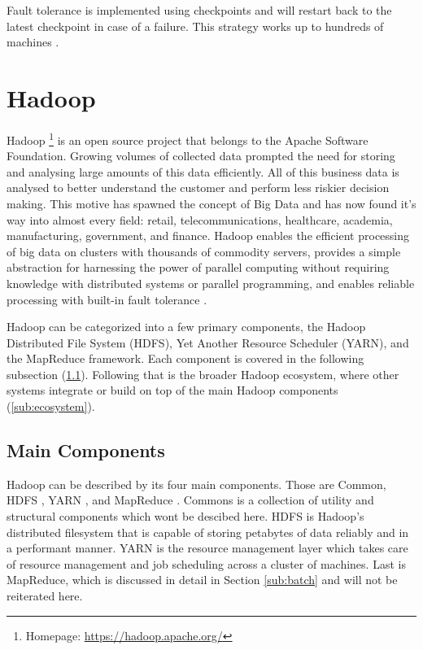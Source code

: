 \documentclass[12pt]{article}
\begin{document}
Fault tolerance is implemented using checkpoints and will restart back to the latest checkpoint in case of a failure. This strategy works up to hundreds of machines \cite{xing2015petuum}.





\section{Hadoop} \label{sec:hadoop}

Hadoop \footnote{Homepage: \url{https://hadoop.apache.org/}} is an open source project that belongs to the Apache Software Foundation. Growing volumes of collected data prompted the need for storing and analysing large amounts of this data efficiently. All of this business data is analysed to better understand the customer and perform less riskier decision making. This motive has spawned the concept of Big Data and has now found it's way into almost every field: retail, telecommunications, healthcare, academia, manufacturing, government, and finance. Hadoop enables the efficient processing of big data on clusters with thousands of commodity servers, provides a simple abstraction for harnessing the power of parallel computing without requiring knowledge with distributed systems or parallel programming, and enables reliable processing with built-in fault tolerance \cite{zhang2016survey,singh2015survey}.

Hadoop can be categorized into a few primary components, the Hadoop Distributed File System (HDFS), Yet Another Resource Scheduler (YARN), and the MapReduce framework. Each component is covered in the following subsection (\ref{sub:components}). Following that is the broader Hadoop ecosystem, where other systems integrate or build on top of the main Hadoop components (\ref{sub:ecosystem}).



\subsection{Main Components} \label{sub:components}

Hadoop can be described by its four main components. Those are Common, HDFS \cite{hdfs}, YARN \cite{yarn}, and MapReduce \cite{dean2008mapreduce}. Commons is a collection of utility and structural components which wont be descibed here. HDFS is Hadoop's distributed filesystem that is capable of storing petabytes of data reliably and in a performant manner. YARN is the resource management layer which takes care of resource management and job scheduling across a cluster of machines. Last is MapReduce, which is discussed in detail in Section \ref{sub:batch} and will not be reiterated here.
\end{document}
